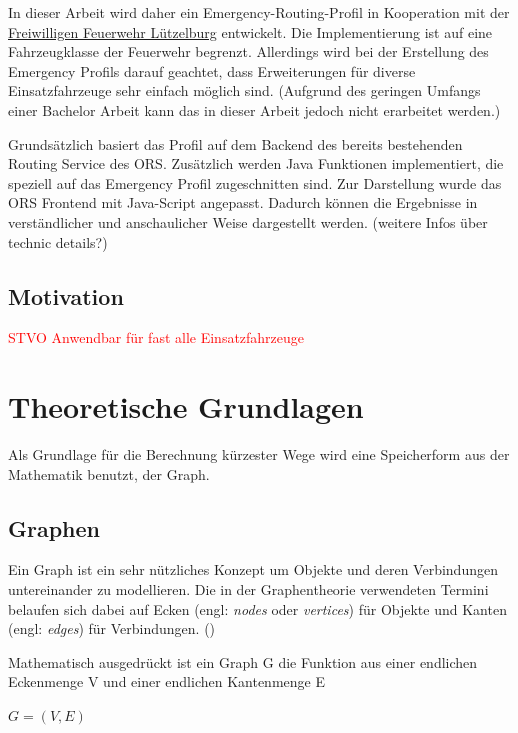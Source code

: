 \documentclass[10pt,a4paper]{article}
\newcommand\todo[1]{\textcolor{red}{#1}}
\begin{document}
In dieser Arbeit wird daher ein Emergency-Routing-Profil in Kooperation mit der \href{https://www.feuerwehr-luetzelburg.de}{Freiwilligen Feuerwehr Lützelburg} entwickelt. Die Implementierung ist auf eine Fahrzeugklasse der Feuerwehr begrenzt. Allerdings wird bei der Erstellung des Emergency Profils darauf geachtet, dass Erweiterungen für diverse Einsatzfahrzeuge sehr einfach möglich sind. (Aufgrund des geringen Umfangs einer Bachelor Arbeit kann das in dieser Arbeit jedoch nicht erarbeitet werden.)
\smallskip

Grundsätzlich basiert das Profil auf dem Backend des bereits bestehenden Routing Service des ORS. Zusätzlich werden Java Funktionen implementiert, die speziell auf das Emergency Profil zugeschnitten sind. Zur Darstellung wurde das ORS Frontend mit Java-Script angepasst. Dadurch können die Ergebnisse in verständlicher und anschaulicher Weise dargestellt werden.
(weitere Infos über technic details?)

\subsection{Motivation}
\todo{
STVO
Anwendbar für fast alle Einsatzfahrzeuge 
}

\newpage
\section{Theoretische Grundlagen}

Als Grundlage für die Berechnung kürzester Wege wird eine Speicherform aus der Mathematik benutzt, der Graph. 

\subsection{Graphen}

Ein Graph ist ein sehr nützliches Konzept um Objekte und deren Verbindungen untereinander zu modellieren. Die in der Graphentheorie verwendeten Termini belaufen sich dabei auf Ecken (engl: \textit{nodes} oder \textit{vertices}) für Objekte und Kanten (engl: \textit{edges}) für Verbindungen.
(\cite[49]{kurt})

Mathematisch ausgedrückt ist ein Graph G die Funktion aus einer endlichen Eckenmenge V und einer endlichen Kantenmenge E

	$G = (V,E)$

\cite[4]{theory}
\end{document}
